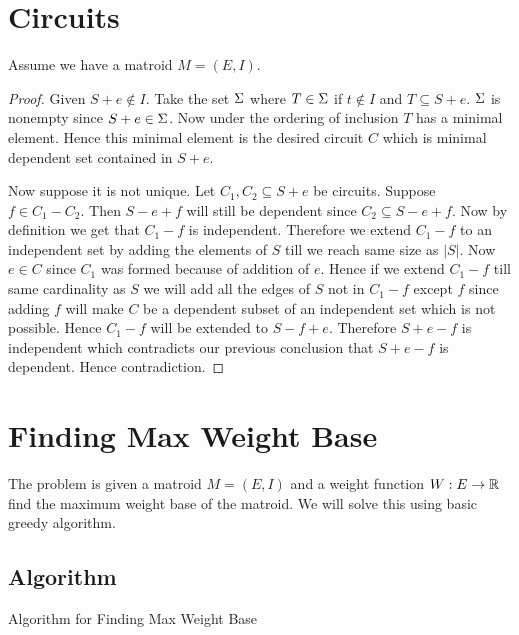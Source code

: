 \documentclass{article}
\begin{document}
\section{Circuits}
Assume we have a matroid $M=(E,I)$. 
\begin{proof}
	Given $S+e\notin I$. Take the set $\Sigma$ where $T\in \Sigma$ if $t\notin I$ and $T\subseteq S+e$. $\Sigma$ is nonempty since $S+e\in \Sigma$. Now under the ordering of inclusion $T$ has a minimal element. Hence this minimal element is the desired circuit $C$ which is minimal dependent set contained in $S+e$.
	
	Now suppose it is not unique. Let $C_1,C_2\subseteq S+e$ be circuits. Suppose $f\in C_1-C_2$. Then $S-e+f$ will still be dependent since $C_2\subseteq S-e+f$. Now by definition we get that $C_1-f$ is independent. Therefore we extend $C_1-f$ to an independent set by adding the elements of $S$ till we reach same size as $|S|$. Now $e\in C$ since $C_1$ was formed because of addition of $e$. Hence if we extend $C_1-f$ till same cardinality as $S$ we will add all the edges of $S$ not in $C_1-f$ except $f$ since adding $f$ will make $C$ be a dependent subset of an independent set which is not possible. Hence $C_1-f$ will be extended to $S-f+e$. Therefore $S+e-f$ is independent which contradicts our previous conclusion that $S+e-f$ is dependent. Hence contradiction.
\end{proof}

\section{Finding Max Weight Base}
The problem is given a matroid $M=(E,I)$ and a weight function $W:E\to \mathbb{R}$ find the maximum weight base of the matroid. We will solve this using basic greedy algorithm. 
\subsection{Algorithm}
\begin{algorithm}
	\DontPrintSemicolon
	\caption{Algorithm for Finding Max Weight Base}
\end{algorithm}
\end{document}
